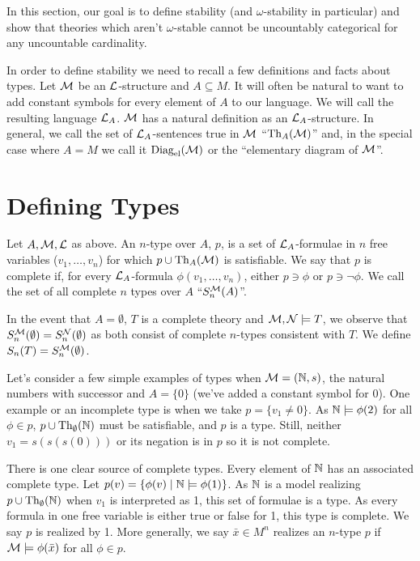 In this section, our goal is to define stability (and \(\omega\)-stability in particular) and show that theories which aren't \(\omega\)-stable cannot be uncountably categorical for any uncountable cardinality. 

In order to define stability we need to recall a few definitions and facts about types. 
Let \(\mathcal{M}\) be an \(\mathcal{L}\)-structure and \(A \subseteq M\). 
It will often be natural to want to add constant symbols for every element of \(A\) to our language. 
We will call the resulting language \(\mathcal{L}_A\). \(\mathcal{M}\) has a natural definition as an \(\mathcal{L}_A\)-structure. 
In general, we call the set of \(\mathcal{L}_A\)-sentences true in \(\mathcal{M}\) ``\(\text{Th}_A(\mathcal{M})\)'' and, in the special case where \(A = M\) we call it \(\text{Diag}_\text{el}(\mathcal{M})\) or the ``elementary diagram of \(\mathcal{M}\)''. 

\section{Defining Types}

\begin{definition}\label{def_types}
Let \(A, \mathcal{M}, \mathcal{L}\) as above. 
An \(n\)-type over \(A\), \(p\), is a set of \(\mathcal{L}_A\)-formulae in \(n\) free variables (\(v_1, \ldots, v_n\)) for which \(p \cup \text{Th}_A(\mathcal{M})\) is satisfiable.
We say that \(p\) is complete if, for every \(\mathcal{L}_A\)-formula \(\phi(v_1, \ldots, v_n)\), either \(p \ni \phi\) or \(p \ni \neg \phi\). 
We call the set of all complete \(n\) types over \(A\) ``\(S_n^{\mathcal{M}}(A)\)''. 

In the event that \(A = \emptyset\), \(T\) is a complete theory and \(\mathcal{M}, \mathcal{N} \models T\), we observe that \(S_n^{\mathcal{M}}(\emptyset) = S_n^{\mathcal{N}}(\emptyset)\) as both consist of complete \(n\)-types consistent with \(T\). 
We define \(S_n(T) = S_n^{\mathcal{M}}(\emptyset)\).
\end{definition}

Let's consider a few simple examples of types when  \(\mathcal{M} = (\mathbb{N},s)\), the natural numbers with successor and \(A = \{0\}\) (we've added a constant symbol for 0). 
One example or an incomplete type is when we take \(p = \{v_1 \neq 0\}\). 
As \(\mathbb{N} \models \phi(2)\) for all \(\phi \in p\), \(p \cup \text{Th}_\emptyset(\mathbb{N})\) must be satisfiable, and \(p\) is a type. 
Still, neither \(v_1 = s(s(s(0)))\) or its negation is in \(p\) so it is not complete. 

There is one clear source of complete types. 
Every element of \(\mathbb{N}\) has an associated complete type. 
Let \(p(v) = \{\phi(v) \mid \mathbb{N} \models \phi(1)\}\). 
As \(\mathbb{N}\) is a model realizing \(p \cup \text{Th}_\emptyset(\mathbb{N})\) when \(v_1\) is interpreted as 1, this set of formulae is a type. 
As every formula in one free variable is either true or false for 1, this type is complete. 
We say \(p\) is realized by 1. 
More generally, we say \(\bar{x} \in M^n\) realizes an \(n\)-type \(p\) if \(\mathcal{M} \models \phi(\bar{x})\) for all \(\phi \in p\).  


